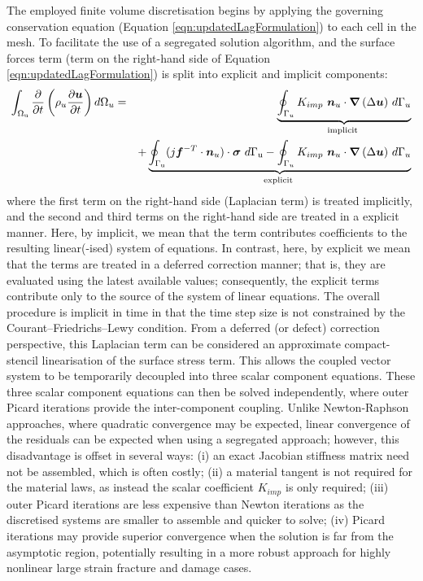 \documentclass[sn-mathphys,Numbered]{sn-jnl}%
\newcommand{\bb}{\boldsymbol}
\begin{document}
The employed finite volume discretisation begins by applying the governing conservation equation (Equation \ref{eqn:updatedLagFormulation}) to each cell in the mesh.
To facilitate the use of a segregated solution algorithm, and the surface forces term (term on the right-hand side of Equation \ref{eqn:updatedLagFormulation}) is split into explicit and implicit components:
\begin{eqnarray} \label{eqn:MomentumImplicitExplicit}
	\int_{\mathrm{\Omega_u}} \frac{\partial }{\partial t} \left( \rho_u \frac{\partial \bb{u} }{\partial t} \right) d\mathrm{\Omega}_u
	&=&
	\underbrace{\oint_{\mathrm{\Gamma}_u}{K_{imp}\  \bb{n}_u\cdot\bb{\nabla}\left(\Delta \bb{u} \right)}\ d\mathrm{\Gamma}_u}_{\text {implicit }} \notag \\
    &&+
    \underbrace{
    \oint_{\mathrm{\Gamma_u}}(j\bb{f}^{-T}\cdot{\bb{n}_u) \cdot \boldsymbol{\sigma}}\ d\mathrm{\Gamma_u}
    - 
    \oint_{\mathrm{\Gamma}_u}{K_{imp}\ 
 \bb{n}_u \cdot \bb{\nabla}\left(\Delta \bb{u}\right)}\ d\Gamma_u
 }_{\text {explicit }}  %
\end{eqnarray}
where the first term on the right-hand side (Laplacian term) is treated implicitly, and the second and third terms on the right-hand side are treated in a explicit manner.
Here, by implicit, we mean that the term contributes coefficients to the resulting linear(-ised) system of equations.
In contrast, here, by explicit we mean that the terms are treated in a deferred correction manner; that is, they are evaluated using the latest available values; consequently, the explicit terms contribute only to the source of the system of linear equations.
The overall procedure is implicit in time in that the time step size is not constrained by the Courant–Friedrichs–Lewy condition.
From a deferred (or defect) correction perspective, this Laplacian term can be considered an approximate compact-stencil linearisation of the surface stress term.
This allows the coupled vector system to be temporarily decoupled into three scalar component equations.
These three scalar component equations can then be solved independently, where outer Picard iterations provide the inter-component coupling.
Unlike Newton-Raphson approaches, where quadratic convergence may be expected, linear convergence of the residuals can be expected when using a segregated approach; however, this disadvantage is offset in several ways: (i) an exact Jacobian stiffness matrix need not be assembled, which is often costly; (ii) a material tangent is not required for the material laws, as instead the scalar coefficient $K_{imp}$ is only required; (iii) outer Picard iterations are less expensive than Newton iterations as the discretised systems are smaller to assemble and quicker to solve; (iv) Picard iterations may provide superior convergence when the solution is far from the asymptotic region, potentially resulting in a more robust approach for highly nonlinear large strain fracture and damage cases.
\end{document}
